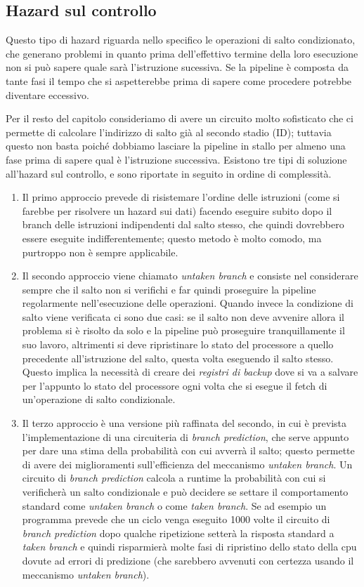 \documentclass[class=book, crop=false, oneside]{standalone}
\begin{document}
\subsection{Hazard sul controllo}
Questo tipo di hazard riguarda nello specifico le operazioni di salto condizionato, che generano problemi in quanto prima dell'effettivo termine della loro esecuzione non si può sapere quale sarà l'istruzione sucessiva. Se la pipeline è composta da tante fasi il tempo che si aspetterebbe prima di sapere come procedere potrebbe diventare eccessivo.

Per il resto del capitolo consideriamo di avere un circuito molto sofisticato che ci permette di calcolare l’indirizzo di salto già al secondo stadio (ID); tuttavia questo non basta poiché dobbiamo lasciare la pipeline in stallo per almeno una fase prima di sapere qual è l'istruzione successiva. Esistono tre tipi di soluzione all'hazard sul controllo, e sono riportate in seguito in ordine di complessità.

\begin{enumerate}
	\item Il primo approccio prevede di risistemare l'ordine delle istruzioni (come si farebbe per risolvere un hazard sui dati) facendo eseguire subito dopo il branch delle istruzioni indipendenti dal salto stesso, che quindi dovrebbero essere eseguite indifferentemente; questo metodo è molto comodo, ma purtroppo non è sempre applicabile.
	\item Il secondo approccio viene chiamato \emph{untaken branch} e consiste nel considerare sempre che il salto non si verifichi e far quindi proseguire la pipeline regolarmente nell'esecuzione delle operazioni. Quando invece la condizione di salto viene verificata ci sono due casi: se il salto non deve avvenire allora il problema si è risolto da solo e la pipeline può proseguire tranquillamente il suo lavoro, altrimenti si deve ripristinare lo stato del processore a quello precedente all'istruzione del salto, questa volta eseguendo il salto stesso. Questo implica la necessità di creare dei \emph{registri di backup} dove si va a salvare per l'appunto lo stato del processore ogni volta che si esegue il fetch di un'operazione di salto condizionale.
	\item Il terzo approccio è una versione più raffinata del secondo, in cui è prevista l'implementazione di una circuiteria di \emph{branch prediction}, che serve appunto per dare una stima della probabilità con cui avverrà il salto; questo permette di avere dei miglioramenti sull'efficienza del meccanismo \emph{untaken branch}. Un circuito di \emph{branch prediction} calcola a runtime la probabilità con cui si verificherà un salto condizionale e può decidere se settare il comportamento standard come \emph{untaken branch} o come \emph{taken branch}. Se ad esempio un programma prevede che un ciclo venga eseguito 1000 volte il circuito di \emph{branch prediction} dopo qualche ripetizione setterà la risposta standard a \emph{taken branch} e quindi risparmierà molte fasi di ripristino dello stato della \acrshort{cpu} dovute ad errori di predizione (che sarebbero avvenuti con certezza usando il meccanismo \emph{untaken branch}).
\end{enumerate}
\end{document}
